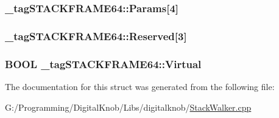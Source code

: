 \hypertarget{struct__tag_s_t_a_c_k_f_r_a_m_e64_a399ef7f5b10fe7afe8121c5045d2c27e}{
\subsubsection[{Params}]{ \-\_\-tag\-S\-T\-A\-C\-K\-F\-R\-A\-M\-E64\-::\-Params\mbox{[}4\mbox{]}}}\label{struct__tag_s_t_a_c_k_f_r_a_m_e64_a399ef7f5b10fe7afe8121c5045d2c27e}
\hypertarget{struct__tag_s_t_a_c_k_f_r_a_m_e64_aeb36e238f4a64f7c02a1930bb7d85732}{
\subsubsection[{Reserved}]{ \-\_\-tag\-S\-T\-A\-C\-K\-F\-R\-A\-M\-E64\-::\-Reserved\mbox{[}3\mbox{]}}}\label{struct__tag_s_t_a_c_k_f_r_a_m_e64_aeb36e238f4a64f7c02a1930bb7d85732}
\hypertarget{struct__tag_s_t_a_c_k_f_r_a_m_e64_a51304e7563d86c3aa68b1783781665a3}{
\subsubsection[{Virtual}]{\setlength{\rightskip}{0pt plus 5cm}B\-O\-O\-L \-\_\-tag\-S\-T\-A\-C\-K\-F\-R\-A\-M\-E64\-::\-Virtual}}\label{struct__tag_s_t_a_c_k_f_r_a_m_e64_a51304e7563d86c3aa68b1783781665a3}


The documentation for this struct was generated from the following file\-:\begin{DoxyCompactItemize}
\item 
G\-:/\-Programming/\-Digital\-Knob/\-Libs/digitalknob/\hyperlink{_stack_walker_8cpp}{Stack\-Walker.\-cpp}\end{DoxyCompactItemize}
